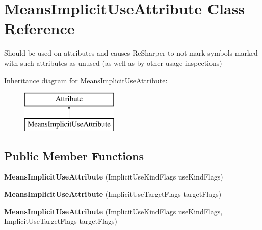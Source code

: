 \hypertarget{class_means_implicit_use_attribute}{}\section{Means\+Implicit\+Use\+Attribute Class Reference}
\label{class_means_implicit_use_attribute}


Should be used on attributes and causes Re\+Sharper to not mark symbols marked with such attributes as unused (as well as by other usage inspections)  


Inheritance diagram for Means\+Implicit\+Use\+Attribute\+:\begin{figure}[H]
\begin{center}
\leavevmode
\includegraphics[height=2.000000cm]{class_means_implicit_use_attribute}
\end{center}
\end{figure}
\subsection*{Public Member Functions}
\begin{DoxyCompactItemize}
\item 
\hypertarget{class_means_implicit_use_attribute_af0c6d4beebf8b380eaf035edd09300a7}{}{\bfseries Means\+Implicit\+Use\+Attribute} (Implicit\+Use\+Kind\+Flags use\+Kind\+Flags)\label{class_means_implicit_use_attribute_af0c6d4beebf8b380eaf035edd09300a7}

\item 
\hypertarget{class_means_implicit_use_attribute_a8f8f931eac84355d49a80623c3a111f6}{}{\bfseries Means\+Implicit\+Use\+Attribute} (Implicit\+Use\+Target\+Flags target\+Flags)\label{class_means_implicit_use_attribute_a8f8f931eac84355d49a80623c3a111f6}

\item 
\hypertarget{class_means_implicit_use_attribute_afca4dbb9e0585f981db7b5b29ff4f664}{}{\bfseries Means\+Implicit\+Use\+Attribute} (Implicit\+Use\+Kind\+Flags use\+Kind\+Flags, Implicit\+Use\+Target\+Flags target\+Flags)\label{class_means_implicit_use_attribute_afca4dbb9e0585f981db7b5b29ff4f664}

\end{DoxyCompactItemize}
